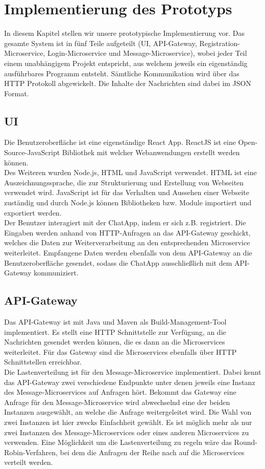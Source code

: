 \section{Implementierung des Prototyps}
In diesem Kapitel stellen wir unsere prototypische Implementierung vor. Das gesamte System ist in fünf Teile aufgeteilt (UI, API-Gateway, Registration-Microservice, Login-Microservice und Message-Microservice), wobei jeder Teil einem unabhängigem Projekt entspricht, aus welchem jeweils ein eigenständig ausführbares Programm entsteht.
Sämtliche Kommunikation wird über das \ac{HTTP} Protokoll abgewickelt. Die Inhalte der Nachrichten sind dabei im \ac{JSON} Format.

\subsection{UI}
Die Benutzeroberfläche ist eine eigenständige React App. ReactJS ist eine Open-Source-JavaScript Bibliothek mit welcher Webanwendungen erstellt werden können.\\
Des Weiteren wurden Node.js, \ac{HTML} und JavaScript verwendet. HTML ist eine Auszeichnungssprache, die zur Strukturierung und Erstellung von Webseiten verwendet wird. JavaScript ist für das Verhalten und Aussehen einer Webseite zuständig und durch Node.js können Bibliotheken bzw. Module importiert und exportiert werden.\\
Der Benutzer interagiert mit der ChatApp, indem er sich z.B. registriert. Die Eingaben werden anhand von HTTP-Anfragen an das API-Gateway geschickt, welches die Daten zur Weiterverarbeitung an den entsprechenden Microservice weiterleitet. Empfangene Daten werden ebenfalls von dem API-Gateway an die Benutzeroberfläche gesendet, sodass die ChatApp ausschließlich mit dem API-Gateway kommuniziert.

\subsection{API-Gateway}
Das API-Gateway ist mit Java und Maven als Build-Management-Tool implementiert. Es stellt eine HTTP Schnittstelle zur Verfügung, an die Nachrichten gesendet werden können, die es dann an die Microservices weiterleitet. Für das Gateway sind die Microservices ebenfalls über HTTP Schnittstellen erreichbar.\\
Die Lastenverteilung ist für den Message-Microservice implementiert. Dabei kennt das API-Gateway zwei verschiedene Endpunkte unter denen jeweils eine Instanz des Message-Microservices auf Anfragen hört. Bekommt das Gateway eine Anfrage für den Message-Microservice wird abwechselnd eine der beiden Instanzen ausgewählt, an welche die Anfrage weitergeleitet wird. Die Wahl von zwei Instanzen ist hier zwecks Einfachheit gewählt. Es ist möglich mehr als nur zwei Instanzen des Message-Microservices oder eines anderen Microservices zu verwenden. Eine Möglichkeit um die Lastenverteilung zu regeln wäre das Round-Robin-Verfahren, bei dem die Anfragen der Reihe nach auf die Microservices verteilt werden.

